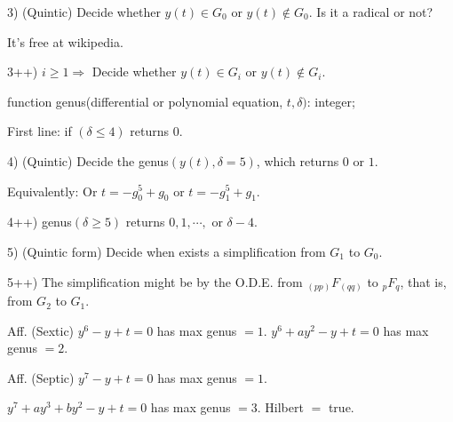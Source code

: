\documentclass[12pt]{article}
\begin{document}
\vspace{3mm}

3) (Quintic) Decide whether $y(t) \in G_0$ or $y(t) \notin G_0$. Is it a radical or not?

\vspace{3mm}

It's free at wikipedia.

\vspace{3mm}

3++) $i \ge 1 \Rightarrow$ Decide whether $y(t) \in G_i$ or $y(t) \notin G_i$.

\vspace{3mm}

function genus(differential or polynomial equation, $t, \delta)$: integer; 

\vspace{3mm}

First line: if $(\delta \le 4)$ returns $0$.

\vspace{3mm}

4) (Quintic) Decide the genus$(y(t), \delta = 5)$, which returns $0$ or $1$.

\vspace{3mm}

Equivalently: Or $t = -g_0^5 + g_0$ or $t = -g_1^5 + g_1$.

\vspace{3mm}

4++) genus$(\delta \ge 5)$ returns $0, 1, \cdots,$ or $\delta - 4$.

\vspace{3mm}

5) (Quintic form) Decide when exists a simplification from $G_1$ to $G_0$.

\vspace{3mm}

5++) The simplification might be by the O.D.E. from ${}_{(pp)}F_{(qq)}$ to ${}_pF_q$, that is, from $G_2$ to $G_1$.

\vspace{3mm}

Aff. (Sextic) $y^6 - y + t = 0$ has max genus $= 1$. $y^6 + ay^2 - y + t = 0$ has max genus $= 2$.

\vspace{3mm}

Aff. (Septic) $y^7 - y + t = 0$ has max genus $= 1$. 

\vspace{3mm}

$y^7 + ay^3 + by^2 - y + t = 0$ has max genus $= 3$. Hilbert $=$ true.
\end{document}
